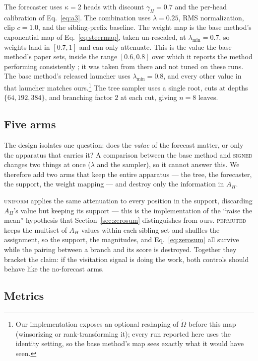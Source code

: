 \documentclass[11pt]{article}
\newcommand{\AH}{A_{H}}
\newcommand{\Omt}{\tilde{\Omega}}
\begin{document}
The forecaster uses $\kappa = 2$ heads with discount $\gamma_H = 0.7$ and the
per-head calibration of Eq.~\eqref{eq:a3}. The combination uses $\lambda = 0.25$,
RMS normalization, clip $c = 1.0$, and the sibling-prefix baseline. The weight map
is the base method's exponential map of Eq.~\eqref{eq:steermap}, taken
un-rescaled, at $\lambda_{\min} = 0.7$, so weights land in $[0.7, 1]$ and can only
attenuate. This is the value the base method's paper sets, inside the range $[0.6, 0.8]$ over
which it reports the method performing consistently
\citep[App.~F.1]{steer}; it was taken from there and not tuned on these runs. The
base method's released launcher uses $\lambda_{\min} = 0.8$, and every other value
in that launcher matches ours.\footnote{Our implementation exposes an optional reshaping of
$\Omt$ before this map (winsorizing or rank-transforming it); every run reported
here uses the identity setting, so the base method's map sees exactly what it would
have seen.} The tree sampler uses a single root, cuts at depths
$\{64, 192, 384\}$, and branching factor $2$ at each cut, giving $n = 8$ leaves.

\subsection{Five arms}

The design isolates one question: does the \emph{value} of the forecast matter, or
only the apparatus that carries it? A comparison between the base method and
\textsc{signed} changes two things at once ($\lambda$ and the sampler), so it cannot
answer this. We therefore add two arms that keep the entire apparatus --- the tree,
the forecaster, the support, the weight mapping --- and destroy only the information
in $\AH$.


\textsc{uniform} applies the same attenuation to every position in the support,
discarding $\AH$'s value but keeping its support --- this is the implementation of
the ``raise the mean'' hypothesis that Section~\ref{sec:zerosum} distinguishes from
ours. \textsc{permuted} keeps the multiset of $\AH$ values within each sibling set and
shuffles the assignment, so the support, the magnitudes, and Eq.~\eqref{eq:zerosum}
all survive while the pairing between a branch and its score is destroyed. Together
they bracket the claim: if the visitation signal is doing the work, both controls
should behave like the no-forecast arms.

\subsection{Metrics}
\end{document}
